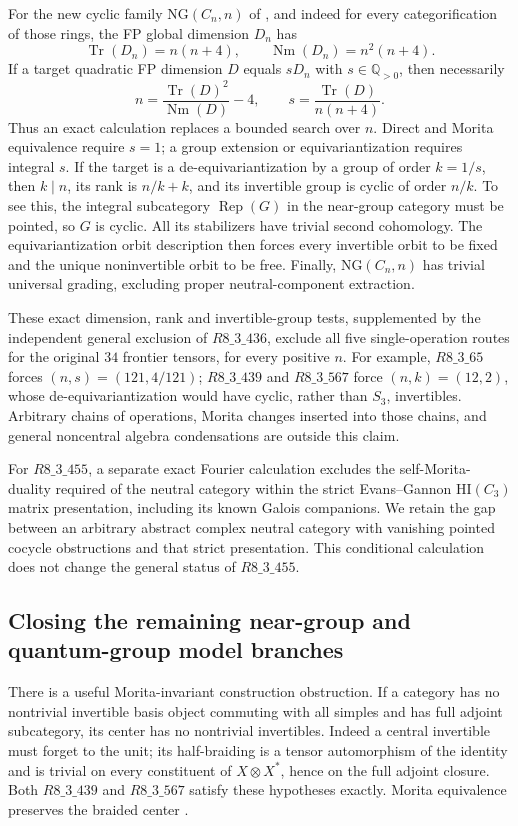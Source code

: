 For the new cyclic family $\mathrm{NG}(C_n,n)$ of
\cite[Theorem~2.10 and Remark~2.11]{NearGroupTPE2026}, and indeed for every
categorification of those rings, the FP global dimension $D_n$ has
\[
\operatorname{Tr}(D_n)=n(n+4),\qquad
\operatorname{Nm}(D_n)=n^2(n+4).
\]
If a target quadratic FP dimension $D$ equals $sD_n$ with $s\in\mathbb Q_{>0}$,
then necessarily
\[
n=\frac{\operatorname{Tr}(D)^2}{\operatorname{Nm}(D)}-4,
\qquad
s=\frac{\operatorname{Tr}(D)}{n(n+4)}.
\]
Thus an exact calculation replaces a bounded search over $n$. Direct and
Morita equivalence require $s=1$; a group extension or equivariantization
requires integral $s$. If the target is a de-equivariantization by a group
of order $k=1/s$, then $k\mid n$, its rank is $n/k+k$, and its invertible
group is cyclic of order $n/k$. To see this, the integral subcategory
$\operatorname{Rep}(G)$ in the near-group category must be pointed, so
$G$ is cyclic. All its stabilizers have trivial second cohomology.
The equivariantization orbit description
\cite[Corollary~2.13 and Remark~3.1]{BurciuNataleEquivariantization}
then forces every invertible orbit to be fixed and the unique
noninvertible orbit to be free. Finally, $\mathrm{NG}(C_n,n)$ has trivial
universal grading, excluding proper neutral-component extraction.

These exact dimension, rank and invertible-group tests, supplemented by
the independent general exclusion of $R8\_3\_436$, exclude all five
single-operation routes for the original $34$ frontier tensors, for every
positive $n$. For example, $R8\_3\_65$ forces $(n,s)=(121,4/121)$;
$R8\_3\_439$ and $R8\_3\_567$ force $(n,k)=(12,2)$, whose
de-equivariantization would have cyclic, rather than $S_3$, invertibles.
Arbitrary chains of operations, Morita changes inserted into those chains,
and general noncentral algebra condensations are outside this claim.

For $R8\_3\_455$, a separate exact Fourier calculation excludes the
self-Morita-duality required of the neutral category within the strict
Evans--Gannon $\mathrm{HI}(C_3)$ matrix presentation, including its known
Galois companions. We retain the gap between an arbitrary abstract complex
neutral category with vanishing pointed cocycle obstructions and that
strict presentation. This conditional calculation does not change the
general status of $R8\_3\_455$.

\subsection{Closing the remaining near-group and quantum-group model branches}
\label{subsec:frontier-known-family-closure}
There is a useful Morita-invariant construction obstruction.
If a category has no nontrivial invertible basis object commuting with
all simples and has full adjoint subcategory, its center has no
nontrivial invertibles. Indeed a central invertible must forget to the
unit; its half-braiding is a tensor automorphism of the identity and is
trivial on every constituent of $X\otimes X^*$, hence on the full
adjoint closure. Both $R8\_3\_439$ and $R8\_3\_567$ satisfy these
hypotheses exactly. Morita equivalence preserves the braided center
\cite[Introduction]{ENOExt}.


